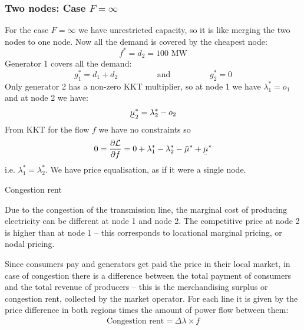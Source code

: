 \documentclass[10pt,dvipsnames]{beamer}
\def\l{\lambda}
\def\m{\mu}
\def\d{\partial}
\def\cL{\mathcal{L}}
\newcommand{\ubar}[1]{\text{\b{$#1$}}}
\begin{document}
\begin{frame}[fragile]
  \frametitle{Two nodes: Case $F = \infty$ }

  For the case $F = \infty$ we have unrestricted capacity, so it is
  like merging the two nodes to one node. Now all the demand is
  covered by the cheapest node:
  \begin{equation*}
    f^* = d_2 = 100\textrm{ MW}
  \end{equation*}
  Generator 1 covers all the demand:
  \begin{equation*}
    g_1^* = d_1+d_2  \hspace{2cm} \textrm{and} \hspace{2cm} g_2^* = 0
  \end{equation*}
  Only generator 2 has a non-zero KKT multiplier, so at node 1 we have
  $\l_1^* =o_1$ and at node 2 we have:
  \begin{equation*}
   \ubar{\m}_2^* = \l_2^* - o_2
  \end{equation*}
  From KKT for the flow $f$ we have no constraints so
  \begin{equation*}
    0 = \frac{\d \cL}{\d f} = 0 +  \l_1^* - \l_2^*  -  \bar{\m}^* + \ubar{\m}^*
  \end{equation*}
  i.e. $\l_1^* = \l_2^*$. We have price equalisation, as if it were a single node.

\end{frame}


\begin{frame}{Congestion rent}

Due to the congestion of the transmission line, the marginal cost of producing electricity can be different at node 1 and node 2. The competitive price at node 2 is higher than at node 1 -- this corresponds to \alert{locational marginal pricing}, or \alert{nodal pricing}.

Since consumers pay and generators get paid the price in their local market, in case of congestion there is a difference between the total payment of consumers and the total revenue of producers -- this is the \alert{merchandising surplus} or \alert{congestion rent}, collected by the market operator. For each line it is given by the price difference in both regions times the amount of power flow between them:
\begin{align*}
\text{Congestion rent =}\:\Delta \lambda\times f
\end{align*}


\end{frame}
\end{document}
